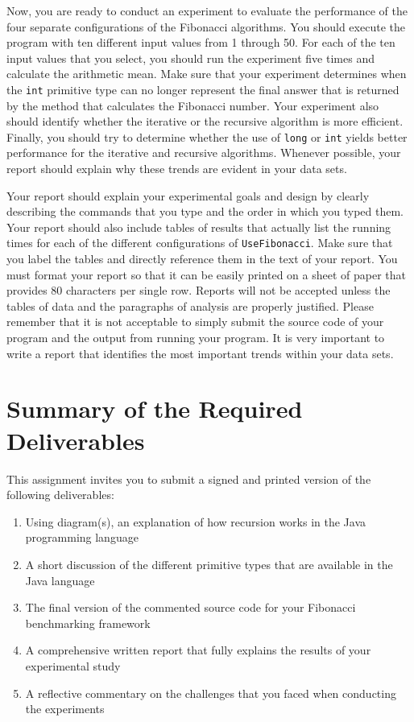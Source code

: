 Now, you are ready to conduct an experiment to evaluate the performance of the four separate configurations of the
Fibonacci algorithms. You should execute the program with ten different input values from 1 through 50. For each of the
ten input values that you select, you should run the experiment five times and calculate the arithmetic mean. Make sure
that your experiment determines when the {\tt int} primitive type can no longer represent the final answer that is
returned by the method that calculates the Fibonacci number. Your experiment also should identify whether the iterative
or the recursive algorithm is more efficient.  Finally, you should try to determine whether the use of {\tt long} or
{\tt int} yields better performance for the iterative and recursive algorithms. Whenever possible, your report should
explain why these trends are evident in your data sets.

Your report should explain your experimental goals and design by clearly describing the commands that you type and the
order in which you typed them. Your report should also include tables of results that actually list the running times
for each of the different configurations of {\tt UseFibonacci}.  Make sure that you label the tables and directly
reference them in the text of your report. You must format your report so that it can be easily printed on a sheet of
paper that provides 80 characters per single row. Reports will not be accepted unless the tables of data and the
paragraphs of analysis are properly justified.  Please remember that it is not acceptable to simply submit the source
code of your program and the output from running your program. It is very important to write a report that identifies
the most important trends within your data sets.

\section*{Summary of the Required Deliverables}

  This assignment invites you to submit a signed and printed version of the following deliverables: 

  \begin{enumerate} 
  \itemsep0pt
  \item Using diagram(s), an explanation of how recursion works in the Java programming language

  \item A short discussion of the different primitive types that are available in the Java language

  \item The final version of the commented source code for your Fibonacci benchmarking framework

  \item A comprehensive written report that fully explains the results of your experimental study

  \item A reflective commentary on the challenges that you faced when conducting the experiments
   
  \end{enumerate}

